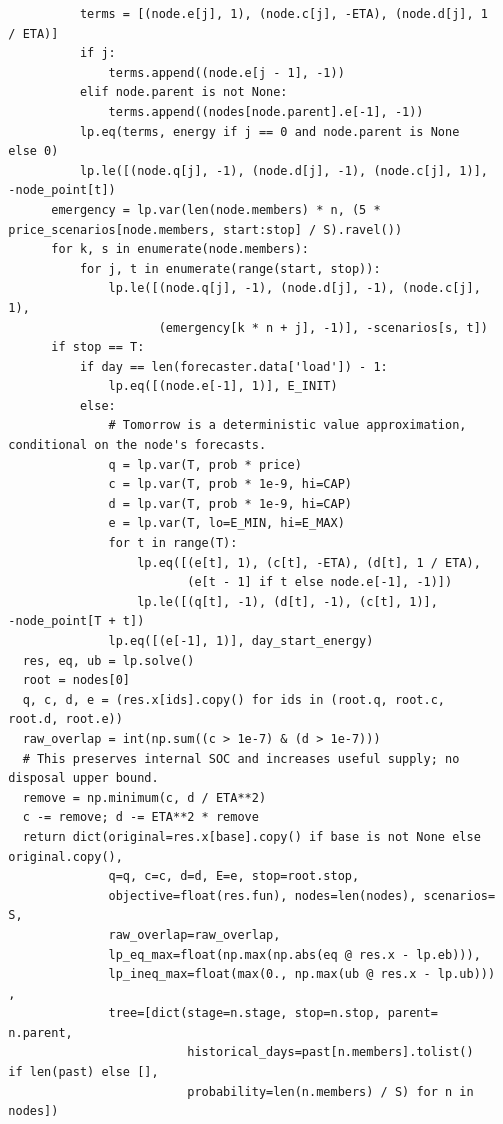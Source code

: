 \begin{verbatim}
            terms = [(node.e[j], 1), (node.c[j], -ETA), (node.d[j], 1
  / ETA)]
            if j:
                terms.append((node.e[j - 1], -1))
            elif node.parent is not None:
                terms.append((nodes[node.parent].e[-1], -1))
            lp.eq(terms, energy if j == 0 and node.parent is None
  else 0)
            lp.le([(node.q[j], -1), (node.d[j], -1), (node.c[j], 1)],
  -node_point[t])
        emergency = lp.var(len(node.members) * n, (5 *
  price_scenarios[node.members, start:stop] / S).ravel())
        for k, s in enumerate(node.members):
            for j, t in enumerate(range(start, stop)):
                lp.le([(node.q[j], -1), (node.d[j], -1), (node.c[j],
  1),
                       (emergency[k * n + j], -1)], -scenarios[s, t])
        if stop == T:
            if day == len(forecaster.data['load']) - 1:
                lp.eq([(node.e[-1], 1)], E_INIT)
            else:
                # Tomorrow is a deterministic value approximation,
  conditional on the node's forecasts.
                q = lp.var(T, prob * price)
                c = lp.var(T, prob * 1e-9, hi=CAP)
                d = lp.var(T, prob * 1e-9, hi=CAP)
                e = lp.var(T, lo=E_MIN, hi=E_MAX)
                for t in range(T):
                    lp.eq([(e[t], 1), (c[t], -ETA), (d[t], 1 / ETA),
                           (e[t - 1] if t else node.e[-1], -1)])
                    lp.le([(q[t], -1), (d[t], -1), (c[t], 1)],
  -node_point[T + t])
                lp.eq([(e[-1], 1)], day_start_energy)
    res, eq, ub = lp.solve()
    root = nodes[0]
    q, c, d, e = (res.x[ids].copy() for ids in (root.q, root.c,
  root.d, root.e))
    raw_overlap = int(np.sum((c > 1e-7) & (d > 1e-7)))
    # This preserves internal SOC and increases useful supply; no
  disposal upper bound.
    remove = np.minimum(c, d / ETA**2)
    c -= remove; d -= ETA**2 * remove
    return dict(original=res.x[base].copy() if base is not None else
  original.copy(),
                q=q, c=c, d=d, E=e, stop=root.stop,
                objective=float(res.fun), nodes=len(nodes), scenarios=
  S,
                raw_overlap=raw_overlap,
                lp_eq_max=float(np.max(np.abs(eq @ res.x - lp.eb))),
                lp_ineq_max=float(max(0., np.max(ub @ res.x - lp.ub)))
  ,
                tree=[dict(stage=n.stage, stop=n.stop, parent=
  n.parent,
                           historical_days=past[n.members].tolist()
  if len(past) else [],
                           probability=len(n.members) / S) for n in
  nodes])
\end{verbatim}

